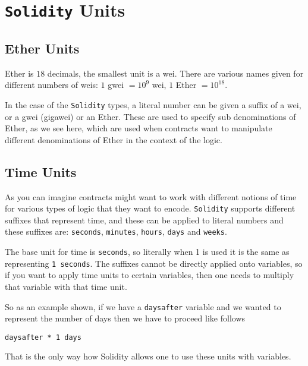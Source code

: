 \section{\texorpdfstring{\texttt{Solidity}
Units}{Solidity Units}}\label{solidity-units}

\subsection{Ether Units}\label{ether-units}

Ether is $18$ decimals, the smallest unit is a wei. There are various
names given for different numbers of weis: $1$ gwei $= 10^9$ wei,
$1$ Ether $= 10^{18}$.

In the case of the \texttt{Solidity} types, a literal number can be
given a suffix of a wei, or a gwei (gigawei) or an Ether. These are used
to specify sub denominations of Ether, as we see here, which are used
when contracts want to manipulate different denominations of Ether in
the context of the logic.

\subsection{Time Units}\label{time-units}

As you can imagine contracts might want to work with different notions
of time for various types of logic that they want to encode.
\texttt{Solidity} supports different suffixes that represent time, and
these can be applied to literal numbers and these suffixes are:
\texttt{seconds}, \texttt{minutes}, \texttt{hours}, \texttt{days} and
\texttt{weeks}.

The base unit for time is \texttt{seconds}, so literally when 1 is used
it is the same as representing \texttt{1\ seconds}. The suffixes cannot
be directly applied onto variables, so if you want to apply time units
to certain variables, then one needs to multiply that variable with that
time unit.

So as an example shown, if we have a \texttt{daysafter} variable and we
wanted to represent the number of days then we have to proceed like
follows

\begin{lstlisting}[language=Solidity,numbers=none]
daysafter * 1 days
\end{lstlisting}

That is the only way how Solidity allows one to use these units with
variables.

